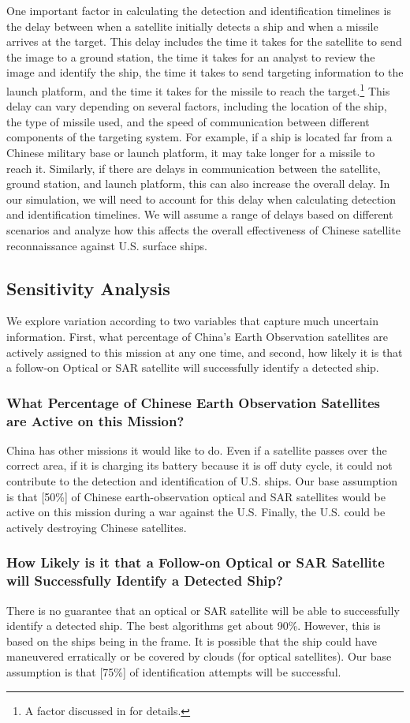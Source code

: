 \documentclass[12pt]{article}
\begin{document}
One important factor in calculating the detection and identification timelines is the delay between when a satellite initially detects a ship and when a missile arrives at the target. This delay includes the time it takes for the satellite to send the image to a ground station, the time it takes for an analyst to review the image and identify the ship, the time it takes to send targeting information to the launch platform, and the time it takes for the missile to reach the target.\footnote{A factor discussed in \cite[pp.~163-164]{heginbothamUSChinaMilitaryScorecard2015} for details.} This delay can vary depending on several factors, including the location of the ship, the type of missile used, and the speed of communication between different components of the targeting system. For example, if a ship is located far from a Chinese military base or launch platform, it may take longer for a missile to reach it. Similarly, if there are delays in communication between the satellite, ground station, and launch platform, this can also increase the overall delay. In our simulation, we will need to account for this delay when calculating detection and identification timelines. We will assume a range of delays based on different scenarios and analyze how this affects the overall effectiveness of Chinese satellite reconnaissance against U.S. surface ships.

\subsection{Sensitivity Analysis}
We explore variation according to two variables that capture much uncertain information. First, what percentage of China's Earth Observation satellites are actively assigned to this mission at any one time, and second, how likely it is that a follow-on Optical or SAR satellite will successfully identify a detected ship.

\subsubsection{What Percentage of Chinese Earth Observation Satellites are Active on this Mission?}
China has other missions it would like to do. Even if a satellite passes over the correct area, if it is charging its battery because it is off duty cycle, it could not contribute to the detection and identification of U.S. ships. Our base assumption is that [50\%] of Chinese earth-observation optical and SAR satellites would be active on this mission during a war against the U.S. Finally, the U.S. could be actively destroying Chinese satellites.

\subsubsection{How Likely is it that a Follow-on Optical or SAR Satellite will Successfully Identify a Detected Ship?}
There is no guarantee that an optical or SAR satellite will be able to successfully identify a detected ship. The best algorithms get about 90\%. However, this is based on the ships being in the frame. It is possible that the ship could have maneuvered erratically or be covered by clouds (for optical satellites). Our base assumption is that [75\%] of identification attempts will be successful.
\end{document}
